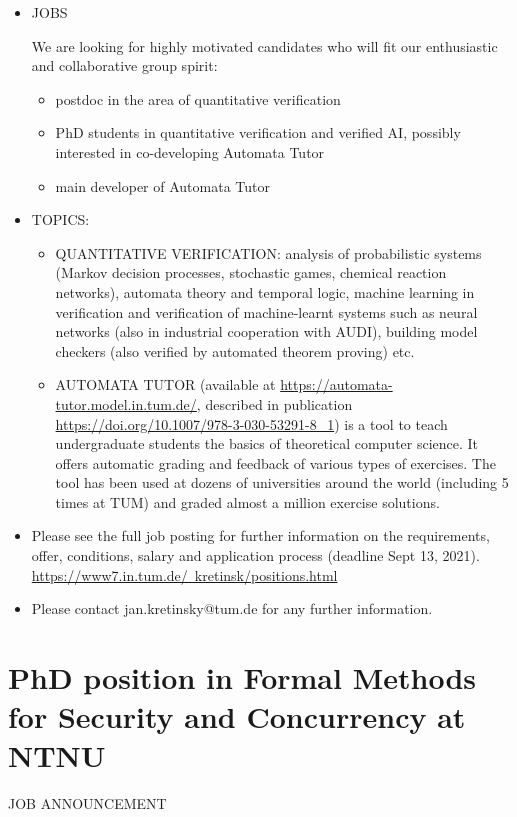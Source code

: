 \documentclass[prodmode,acmtecs]{acmsmall} %
\begin{document}
\begin{itemize}\item  JOBS 
 
  We are looking for highly motivated candidates who will fit our enthusiastic and collaborative group spirit: 
 
\begin{itemize}\item  postdoc in the area of quantitative verification
\item  PhD students in quantitative verification and verified AI, possibly interested in co-developing Automata Tutor
\item  main developer of Automata Tutor 
\end{itemize} 
\item  TOPICS:  
 
\begin{itemize}\item  QUANTITATIVE VERIFICATION: analysis of probabilistic systems (Markov decision processes, stochastic games, chemical reaction networks), automata theory and temporal logic, machine learning in verification and verification of machine-learnt systems such as neural networks (also in industrial cooperation with AUDI), building model checkers (also verified by automated theorem proving) etc.
\item  AUTOMATA TUTOR (available at \href{https://automata-tutor.model.in.tum.de/}{https://automata-tutor.model.in.tum.de/}, described in publication \href{https://doi.org/10.1007/978-3-030-53291-8_1}{https://doi.org/10.1007/978-3-030-53291-8\_1}) is a tool to teach undergraduate students the basics of theoretical computer science. It offers automatic grading and feedback of various types of exercises. The tool has been used at dozens of universities around the world (including 5 times at TUM) and graded almost a million exercise solutions. 
\end{itemize} 
\item  Please see the full job posting for further information on the requirements, offer, conditions, salary and application process (deadline Sept 13, 2021). \href{https://www7.in.tum.de/~kretinsk/positions.html}{https://www7.in.tum.de/~kretinsk/positions.html} 
 
\item  Please contact jan.kretinsky@tum.de for any further information.  
 
\end{itemize}\section{PhD position in Formal Methods for Security and Concurrency at NTNU}\label{PhDpositioninFormalMethodsforSecurityandConcurrencyatNTNU}JOB ANNOUNCEMENT 
\end{document}
